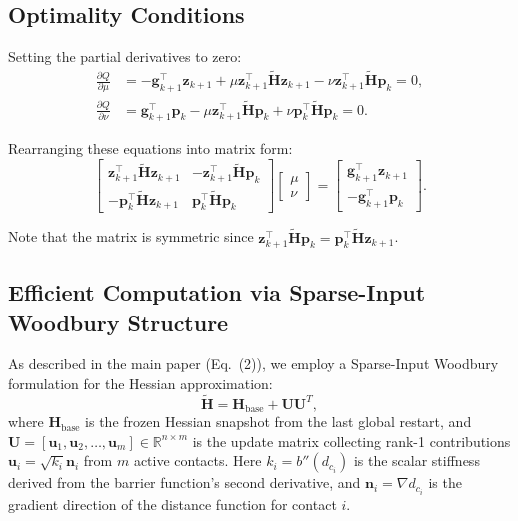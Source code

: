 \documentclass[acmtog,anonymous,review,screen,nonacm]{acmart}
\begin{document}
\subsection{Optimality Conditions}
Setting the partial derivatives to zero:
\begin{align}
    \frac{\partial Q}{\partial \mu} &= -\mathbf{g}_{k+1}^\top \mathbf{z}_{k+1} + \mu \mathbf{z}_{k+1}^\top \tilde{\mathbf{H}} \mathbf{z}_{k+1} - \nu \mathbf{z}_{k+1}^\top \tilde{\mathbf{H}} \mathbf{p}_k = 0, \\
    \frac{\partial Q}{\partial \nu} &= \mathbf{g}_{k+1}^\top \mathbf{p}_k - \mu \mathbf{z}_{k+1}^\top \tilde{\mathbf{H}} \mathbf{p}_k + \nu \mathbf{p}_k^\top \tilde{\mathbf{H}} \mathbf{p}_k = 0.
\end{align}

Rearranging these equations into matrix form:
\begin{equation}
    \begin{bmatrix} 
    \mathbf{z}_{k+1}^\top \tilde{\mathbf{H}} \mathbf{z}_{k+1} & -\mathbf{z}_{k+1}^\top \tilde{\mathbf{H}} \mathbf{p}_k \\ 
    -\mathbf{p}_k^\top \tilde{\mathbf{H}} \mathbf{z}_{k+1} & \mathbf{p}_k^\top \tilde{\mathbf{H}} \mathbf{p}_k 
    \end{bmatrix} 
    \begin{bmatrix} \mu \\ \nu \end{bmatrix} 
    = 
    \begin{bmatrix} \mathbf{g}_{k+1}^\top \mathbf{z}_{k+1} \\ -\mathbf{g}_{k+1}^\top \mathbf{p}_k \end{bmatrix}.
\end{equation}

Note that the matrix is symmetric since $\mathbf{z}_{k+1}^\top \tilde{\mathbf{H}} \mathbf{p}_k = \mathbf{p}_k^\top \tilde{\mathbf{H}} \mathbf{z}_{k+1}$.

\subsection{Efficient Computation via Sparse-Input Woodbury Structure}
As described in the main paper (Eq.~(2)), we employ a Sparse-Input Woodbury formulation for the Hessian approximation:
\begin{equation}
    \tilde{\mathbf{H}} = \mathbf{H}_{\text{base}} + \mathbf{U} \mathbf{U}^T,
    \label{eq:woodbury_hessian}
\end{equation}
where $\mathbf{H}_{\text{base}}$ is the frozen Hessian snapshot from the last global restart, and $\mathbf{U} = [\mathbf{u}_1, \mathbf{u}_2, \dots, \mathbf{u}_m] \in \mathbb{R}^{n \times m}$ is the update matrix collecting rank-1 contributions $\mathbf{u}_i = \sqrt{k_i} \mathbf{n}_i$ from $m$ active contacts. Here $k_i = b''(d_{c_i})$ is the scalar stiffness derived from the barrier function's second derivative, and $\mathbf{n}_i = \nabla d_{c_i}$ is the gradient direction of the distance function for contact $i$.
\end{document}
